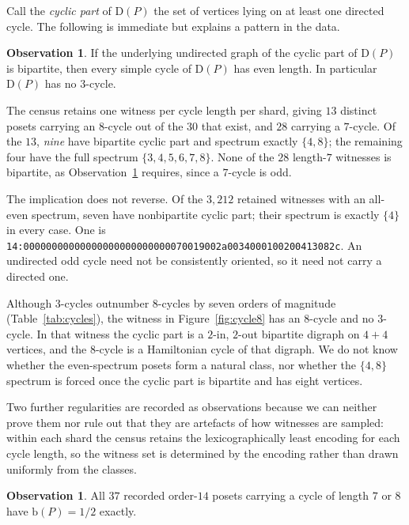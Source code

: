 \documentclass[11pt]{article}
\theoremstyle{definition}
\newtheorem{observation}[theorem]{Observation}
\newcommand{\bal}{\mathrm{b}}
\newcommand{\Dig}{\mathrm{D}}
\newcommand{\CEIGHT}{30}
\begin{document}
Call the \emph{cyclic part} of $\Dig(P)$ the set of vertices lying on at least
one directed cycle.  The following is immediate but explains a pattern in the
data.

\begin{observation}\label{obs:even}
If the underlying undirected graph of the cyclic part of $\Dig(P)$ is
bipartite, then every simple cycle of $\Dig(P)$ has even length.  In
particular $\Dig(P)$ has no $3$-cycle.
\end{observation}

The census retains one witness per cycle length per shard, giving $13$
distinct posets carrying an $8$-cycle out of the $\CEIGHT$ that exist, and
$28$ carrying a $7$-cycle.  Of the $13$, \emph{nine} have
bipartite cyclic part and spectrum exactly $\{4,8\}$; the remaining four have
the full spectrum $\{3,4,5,6,7,8\}$.  None of the $28$ length-$7$ witnesses is
bipartite, as Observation~\ref{obs:even} requires, since a $7$-cycle is odd.

The implication does not reverse.  Of the $3{,}212$ retained witnesses with
an all-even spectrum, seven have nonbipartite cyclic part; their spectrum is
exactly $\{4\}$ in every case.  One is
\texttt{14:00000000000000000000000000070019002a0034000100200413082c}.  An
undirected odd cycle need not be consistently oriented, so it need not carry a
directed one.

Although $3$-cycles outnumber $8$-cycles by seven orders of magnitude
(Table~\ref{tab:cycles}), the witness in Figure~\ref{fig:cycle8} has an
$8$-cycle and no $3$-cycle.  In that witness the
cyclic part is a $2$-in, $2$-out bipartite digraph on $4+4$ vertices, and the
$8$-cycle is a Hamiltonian cycle of that digraph.  We do not know whether the
even-spectrum posets form a natural class, nor whether the $\{4,8\}$ spectrum
is forced once the cyclic part is bipartite and has eight vertices.

Two further regularities are recorded as observations because we can neither
prove them nor rule out that they are artefacts of how witnesses are sampled:
within each shard the census retains the lexicographically least encoding for
each cycle length, so the witness set is determined by the encoding rather
than drawn uniformly from the classes.

\begin{observation}\label{obs:half}
All $37$ recorded order-$14$ posets carrying a cycle of length $7$ or $8$ have
$\bal(P)=1/2$ exactly.
\end{observation}
\end{document}
